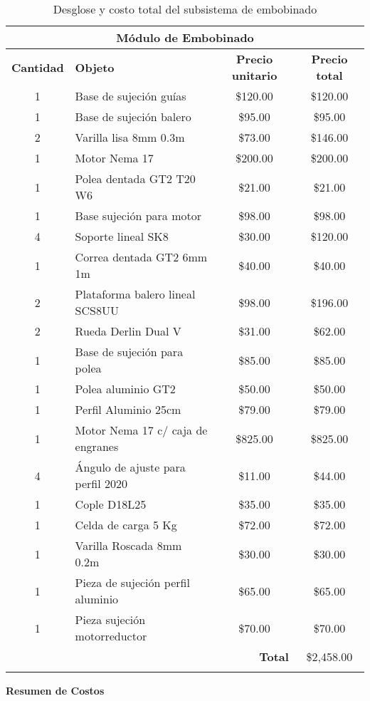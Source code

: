 \documentclass[14pt,oneside]{extarticle} %
\begin{document}
\begin{longtable}{|c|l|c|c|}
\hline
\multicolumn{4}{|c|}{\textbf{Módulo de Embobinado}} \\ \hline
\textbf{\centering Cantidad} & \textbf{\centering Objeto} & \textbf{\centering Precio unitario} & \textbf{\centering Precio total} \\ \hline
1 & Base de sujeción guías & \$120.00 & \$120.00 \\ \hline
1 & Base de sujeción balero & \$95.00 & \$95.00 \\ \hline
2 & Varilla lisa 8mm 0.3m & \$73.00 & \$146.00 \\ \hline
1 & Motor Nema 17 & \$200.00 & \$200.00 \\ \hline
1 & Polea dentada GT2 T20 W6 & \$21.00 & \$21.00 \\ \hline
1 & Base sujeción para motor & \$98.00 & \$98.00 \\ \hline
4 & Soporte lineal SK8 & \$30.00 & \$120.00 \\ \hline
1 & Correa dentada GT2 6mm 1m & \$40.00 & \$40.00 \\ \hline
2 & Plataforma balero lineal SCS8UU & \$98.00 & \$196.00 \\ \hline
2 & Rueda Derlin Dual V & \$31.00 & \$62.00 \\ \hline
1 & Base de sujeción para polea & \$85.00 & \$85.00 \\ \hline
1 & Polea aluminio GT2 & \$50.00 & \$50.00 \\ \hline
1 & Perfil Aluminio 25cm & \$79.00 & \$79.00 \\ \hline
1 & Motor Nema 17 c/ caja de engranes & \$825.00 & \$825.00 \\ \hline
4 & Ángulo de ajuste para perfil 2020 & \$11.00 & \$44.00 \\ \hline
1 & Cople D18L25 & \$35.00 & \$35.00 \\ \hline
1 & Celda de carga 5 Kg & \$72.00 & \$72.00 \\ \hline
1 & Varilla Roscada 8mm 0.2m & \$30.00 & \$30.00 \\ \hline
1 & Pieza de sujeción perfil aluminio & \$65.00 & \$65.00 \\ \hline
1 & Pieza sujeción motorreductor & \$70.00 & \$70.00 \\ \hline
\multicolumn{3}{|r|}{\textbf{Total}} & \$2,458.00 \\ \hline
\caption{Desglose y costo total del subsistema de embobinado}
\end{longtable}

\textbf{Resumen de Costos}
\end{document}
